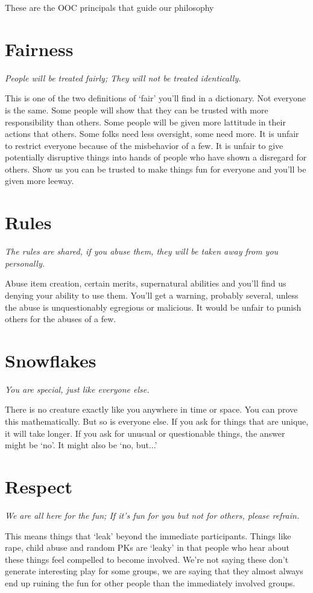 These are the OOC principals that guide our philosophy
\section{Fairness}
{\em People will be treated fairly; They will not be treated identically.}

This is one of the two definitions of `fair' you'll find in a
dictionary. Not everyone is the same. Some people will show that they
can be trusted with more responsibility than others. Some people will be
given more lattitude in their actions that others. Some folks need less
oversight, some need more. It is unfair to restrict everyone because of
the misbehavior of a few. It is unfair to give potentially disruptive
things into hands of people who have shown a disregard for others. Show
us you can be trusted to make things fun for everyone and you'll be
given more leeway.
\section{Rules}
{\em The rules are shared, if you abuse them, they will be taken away from you personally.}

Abuse item creation, certain merits, supernatural abilities and you'll
find us denying your ability to use them. You'll get a warning, probably
several, unless the abuse is unquestionably egregious or malicious. It
would be unfair to punish others for the abuses of a few.
\section{Snowflakes}
{\em You are special, just like everyone else.}

There is no creature exactly like you anywhere in time or space. You
can prove this mathematically. But so is everyone else. If you ask for
things that are unique, it will take longer. If you ask for unusual
or questionable things, the answer might be `no'. It might also be
`no, but...'
\section{Respect}
{\em We are all here for the fun; If it's fun for you but not for others, please refrain.}

This means things that `leak' beyond the immediate participants. Things
like rape, child abuse and random PKs are `leaky' in that people who
hear about these things feel compelled to become involved. We’re not
saying these don’t generate interesting play for some groups, we are
saying that they almost always end up ruining the fun for other people
than the immediately involved groups.
